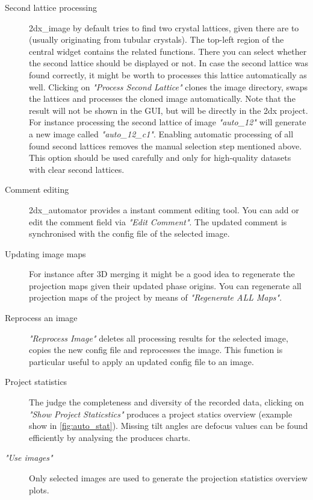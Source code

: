 \begin{description}
	\item [Second lattice processing] 2dx\_image by default tries to find two crystal lattices, given there are to (usually originating from tubular crystals). The top-left region of the central widget contains the related functions. There you can select whether the second lattice should be displayed or not. In case the second lattice was found correctly, it might be worth to processes this lattice automatically as well. Clicking on \textit{"Process Second Lattice"} clones the image directory, swaps the lattices and processes the cloned image automatically. Note that the result will not be shown in the GUI, but will be directly in the 2dx project. For instance processing the second lattice of image \textit{"auto\_12"} will generate a new image called \textit{"auto\_12\_c1"}. Enabling automatic processing of all found second lattices removes the manual selection step mentioned above. This option should be used carefully and only for high-quality datasets with clear second lattices.
	
	\item [Comment editing] 2dx\_automator provides a instant comment editing tool. You can add or edit the comment field via \textit{"Edit Comment"}. The updated comment is synchronised with the config file of the selected image.
	
	\item [Updating image maps] For instance after 3D merging it might be a good idea to regenerate the projection maps given their updated phase origins. You can regenerate all projection maps of the project by means of \textit{"Regenerate ALL Maps"}.
	
	\item [Reprocess an image] \textit{"Reprocess Image"} deletes all processing results for the selected image, copies the new config file and reprocesses the image. This function is particular useful to apply an updated config file to an image.
	
	\item [Project statistics] The judge the completeness and diversity of the recorded data, clicking on \textit{"Show Project Staticstics"} produces a project statics overview (example show in \autoref{fig:auto_stat}). Missing tilt angles are defocus values can be found efficiently by analysing the produces charts.
	
	\item [\textit{"Use images"}] Only selected images are used to generate the projection statistics overview plots.
	

\end{description}
